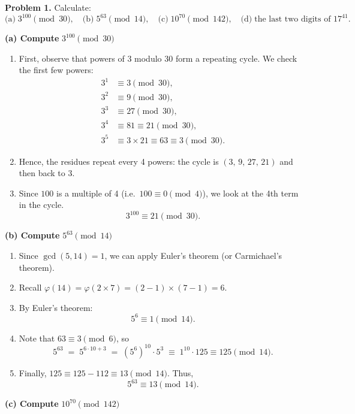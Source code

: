 \documentclass[12pt]{article}
\title{}
\author{Jerich Lee}
\date{\today}
\theoremstyle{definition} %
\theoremstyle{plain} %
\begin{document}
\maketitle
\noindent
\textbf{Problem 1.} Calculate:
\[
\text{(a)}\; 3^{100} \pmod{30}, 
\quad
\text{(b)}\; 5^{63} \pmod{14},
\quad
\text{(c)}\; 10^{70} \pmod{142},
\quad
\text{(d)}\; \text{the last two digits of } 17^{41}.
\]

\bigskip
\textbf{(a) Compute } $3^{100} \pmod{30}$

\begin{enumerate}
\item First, observe that powers of 3 modulo 30 form a repeating cycle. We check the first few powers:
\[
\begin{aligned}
3^1 &\equiv 3 \pmod{30},\\
3^2 &\equiv 9 \pmod{30},\\
3^3 &\equiv 27 \pmod{30},\\
3^4 &\equiv 81 \equiv 21 \pmod{30}, \\
3^5 &\equiv 3 \times 21 \equiv 63 \equiv 3 \pmod{30}.
\end{aligned}
\]
\item Hence, the residues repeat every 4 powers: the cycle is $(3,\,9,\,27,\,21)$ and then back to $3$.
\item Since $100$ is a multiple of 4 (i.e.\ $100 \equiv 0 \pmod{4}$), we look at the 4th term in the cycle.
\[
3^{100} \equiv 21 \pmod{30}.
\]
\end{enumerate}

\bigskip
\textbf{(b) Compute } $5^{63} \pmod{14}$

\begin{enumerate}
\item Since $\gcd(5,14) = 1$, we can apply Euler's theorem (or Carmichael's theorem). 
\item Recall $\varphi(14) = \varphi(2 \times 7) = (2-1)\times(7-1) = 6$. 
\item By Euler's theorem:
\[
5^6 \equiv 1 \pmod{14}.
\]
\item Note that $63 \equiv 3 \pmod{6}$, so
\[
5^{63} \;=\; 5^{6 \cdot 10 + 3} \;=\; (5^6)^{10} \cdot 5^3 \;\equiv\; 1^{10} \cdot 125 \equiv 125 \pmod{14}.
\]
\item Finally, $125 \equiv 125 - 112 \equiv 13 \pmod{14}$. Thus,
\[
5^{63} \equiv 13 \pmod{14}.
\]
\end{enumerate}

\bigskip
\textbf{(c) Compute } $10^{70} \pmod{142}$
\end{document}
